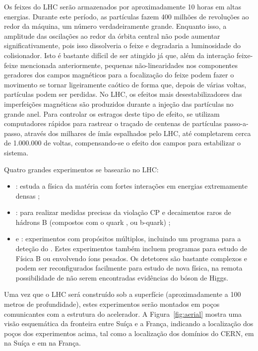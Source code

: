 Os feixes do LHC serão armazenados por aproximadamente 10 horas em altas
energias. Durante este período, as partículas fazem 400 milhões de revoluções
ao redor da máquina, um número verdadeiramente grande. Enquanto isso, a
amplitude das oscilações ao redor da órbita central não pode aumentar
significativamente, pois isso dissolveria o feixe e degradaria a luminosidade
do colisionador. Isto é bastante difícil de ser atingido já que, além da
interação feixe-feixe mencionada anteriormente, pequenas não-linearidades nos
componentes geradores dos campos magnéticos para a focalização do feixe podem
fazer o movimento se tornar ligeiramente caótico de forma que, depois de
várias voltas, partículas podem ser perdidas. No LHC, os efeitos mais
desestabilizadores das imperfeições magnéticas são produzidos durante a
injeção das partículas no grande anel. Para controlar os estragos deste tipo
de efeito, se utilizam computadores rápidos para rastrear o traçado de
centenas de partículas passo-a-passo, através dos milhares de ímãs espalhados
pelo LHC, até completarem cerca de 1.000.000 de voltas, compensando-se o
efeito dos campos para estabilizar o sistema.

Quatro grandes experimentos se basearão no LHC:

\begin{itemize}

\item {}: estuda a física da matéria com fortes interações
em energias extremamente densas \cite{alice};

\item {}: para realizar medidas precisas da violação CP e
decaimentos raros de hádrons B (compostos com o quark , ou
b-quark) \cite{lhcb};

\item {} \cite{atlas-site} e  \cite{cms}:
experimentos com propósitos múltiplos, incluindo um programa para a deteção do
. Estes experimentos também incluem programas para estudo
de Física B ou envolvendo íons pesados. Os detetores são bastante complexos e
podem ser reconfigurados facilmente para estudo de nova física, na remota
possibilidade de não serem encontradas evidências do bóson de Higgs.

\end{itemize}

Uma vez que o LHC será construído sob a superfície (aproximadamente a 100
metros de profundidade), estes experimentos serão montados em poços
comunicantes com a estrutura do acelerador. A Figura~\ref{fig:aerial} mostra
uma visão esquemática da fronteira entre Suíça e a França, indicando a
localização dos poços dos experimentos acima, tal como a localização dos
domínios do CERN, em
 na Suíça e em  na França.

